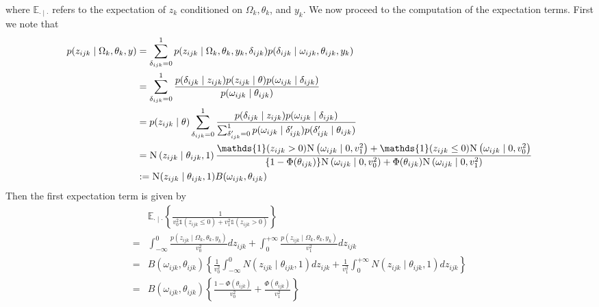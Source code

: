\documentclass[a4paper, 11pt, oneside]{report}
\newcommand{\E}{\mathbb{E}}
\newcommand{\1}{\mathds{1}}
\newcommand{\Nor}{\textsc{N}}
\begin{document}
where $\E_{\cdot \mid \cdot}$ refers to the expectation of $z_k$ conditioned on $\Omega_k, \theta_k$, and $y_k$.
We now proceed to the computation of the expectation terms.
First we note that \begin{align*}
	p(z_{ijk} \mid \Omega_k, \theta_k, y) & =
	\sum_{\delta_{ijk} = 0}^1 p(z_{ijk} \mid \Omega_k, \theta_k, y_k, \delta_{ijk})
	p(\delta_{ijk} \mid \omega_{ijk}, \theta_{ijk}, y_k)                                                                                                                                                                                                                                                                                                               \\
	                                      & = \sum_{\delta_{ijk} = 0}^1 \frac{p(\delta_{ijk} \mid z_{ijk}) p(z_{ijk} \mid \theta) p(\omega_{ijk} \mid \delta_{ijk})}{p(\omega_{ijk} \mid \theta_{ijk})}                                                                                                                                                                \\
	                                      & = p(z_{ijk} \mid \theta) \sum_{\delta_{ijk} = 0}^1 \frac{p(\delta_{ijk} \mid z_{ijk}) p(\omega_{ijk} \mid \delta_{ijk})}{\sum_{\delta'_{ijk} = 0}^1 p(\omega_{ijk} \mid \delta'_{ijk}) p(\delta'_{ijk} \mid \theta_{ijk})}                                                                                                 \\
	                                      & = \Nor\left(z_{ijk} \mid \theta_{ijk}, 1\right) \frac{\1(z_{ijk} > 0)\Nor\left(\omega_{ijk} \mid 0,v_1^2\right) + \1(z_{ijk} \leq 0) \Nor\left(\omega_{ijk} \mid 0, v_0^2\right)}{\{1 - \Phi(\theta_{ijk})\} \Nor\left(\omega_{ijk} \mid 0, v_0^2\right) + \Phi(\theta_{ijk}) \Nor\left(\omega_{ijk} \mid 0, v_1^2\right)} \\
	                                      & := \Nor(z_{ijk} \mid \theta_{ijk}, 1) B(\omega_{ijk}, \theta_{ijk})
\end{align*}
Then the first expectation term is given by
\begin{align*}
	  & \E_{\cdot \mid \cdot} \left\{ \frac{1}{v_0^2 \1(z_{ijk} \leq 0) + v_1^2 \1(z_{ijk} > 0)} \right\}                                                                                                  \\
	= & \int_{-\infty}^0 \frac{p(z_{ijk} \mid \Omega_k, \theta_k, y_k )}{v_0^2} dz_{ijk}
	+ \int_0^{+\infty} \frac{p(z_{ijk} \mid \Omega_k, \theta_k, y_k)}{v_1^2} dz_{ijk}                                                                                                                      \\
	= & B(\omega_{ijk}, \theta_{ijk}) \left\{\frac{1}{v_0^2} \int_{-\infty}^0 N(z_{ijk} \mid \theta_{ijk}, 1) dz_{ijk} + \frac{1}{v_1^2} \int_0^{+\infty} N(z_{ijk} \mid \theta_{ijk}, 1) dz_{ijk}\right\} \\
	= & B(\omega_{ijk}, \theta_{ijk}) \left\{\frac{1 - \Phi(\theta_{ijk})}{v_0^2} + \frac{\Phi(\theta_{ijk})}{v_1^2}\right\}
\end{align*}
\end{document}
